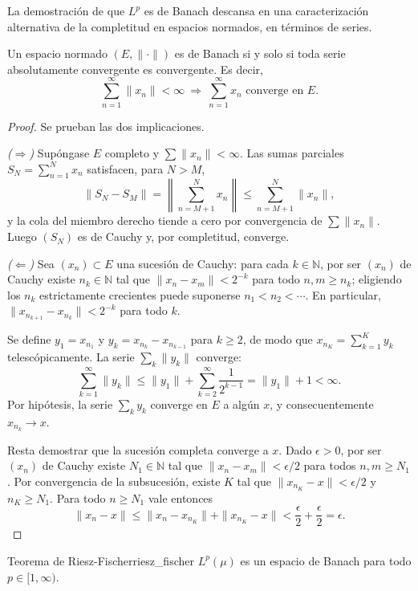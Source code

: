 \documentclass[11pt, a4paper]{article}
\begin{document}
La demostración de que $L^p$ es de Banach descansa en una caracterización alternativa de la
completitud en espacios normados, en términos de series.

\begin{lema}
\label{lema:completitud_normados}
Un espacio normado $(E, \|\cdot\|)$ es de Banach si y solo si toda serie absolutamente convergente
es convergente. Es decir,
$$ \sum_{n=1}^{\infty} \|x_n\| < \infty \ \Longrightarrow\ \sum_{n=1}^{\infty} x_n
\text{ converge en } E. $$
\end{lema}

\begin{proof}
Se prueban las dos implicaciones.

\textit{($\Rightarrow$)} Supóngase $E$ completo y $\sum \|x_n\| < \infty$. Las sumas parciales
$S_N = \sum_{n=1}^N x_n$ satisfacen, para $N > M$,
$$ \|S_N - S_M\| = \left\| \sum_{n=M+1}^N x_n \right\| \le \sum_{n=M+1}^N \|x_n\|, $$
y la cola del miembro derecho tiende a cero por convergencia de $\sum \|x_n\|$. Luego $(S_N)$ es
de Cauchy y, por completitud, converge.

\textit{($\Leftarrow$)} Sea $(x_n) \subset E$ una sucesión de Cauchy: para cada $k \in \mathbb{N}$, por ser
$(x_n)$ de Cauchy existe $n_k \in \mathbb{N}$ tal que $\|x_n - x_m\| < 2^{-k}$ para todo $n, m \ge n_k$; 
eligiendo los $n_k$ estrictamente crecientes puede suponerse $n_1 < n_2 < \cdots$. En particular,
$\|x_{n_{k+1}} - x_{n_k}\| < 2^{-k}$ para todo $k$.

Se define $y_1 = x_{n_1}$ y $y_k = x_{n_k} - x_{n_{k-1}}$ para $k \ge 2$, de modo que
$x_{n_K} = \sum_{k=1}^K y_k$ telescópicamente. La serie $\sum_k \|y_k\|$ converge:
$$ \sum_{k=1}^\infty \|y_k\| \le \|y_1\| + \sum_{k=2}^\infty \frac{1}{2^{k-1}} = \|y_1\| + 1
< \infty. $$
Por hipótesis, la serie $\sum_k y_k$ converge en $E$ a algún $x$, y consecuentemente
$x_{n_k} \to x$.

Resta demostrar que la sucesión completa converge a $x$. Dado $\epsilon > 0$, por ser $(x_n)$ de
Cauchy existe $N_1 \in \mathbb{N}$ tal que $\|x_n - x_m\| < \epsilon/2$ para todos $n, m \ge N_1$.
Por convergencia de la subsucesión, existe $K$ tal que $\|x_{n_K} - x\| < \epsilon/2$ y
$n_K \ge N_1$. Para todo $n \ge N_1$ vale entonces
$$ \|x_n - x\| \le \|x_n - x_{n_K}\| + \|x_{n_K} - x\| < \frac{\epsilon}{2} + \frac{\epsilon}{2}
= \epsilon. $$
\end{proof}

\begin{teorema}{Teorema de Riesz-Fischer}{riesz_fischer}
$L^p(\mu)$ es un espacio de Banach para todo $p \in [1, \infty)$.
\end{teorema}
\end{document}
